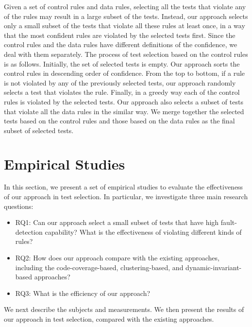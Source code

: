 \documentclass{sig-alternate}
\begin{document}
Given a set of control rules and data rules, selecting all the tests
that violate any of the rules may result in a large subset of the
tests. Instead, our approach selects only a small subset of the
tests that violate all these rules at least once, in a way that the
most confident rules are violated by the selected tests first. Since
the control rules and the data rules have different definitions of
the confidence, we deal with them separately. The process of test
selection based on the control rules is as follows. Initially, the
set of selected tests is empty. Our approach sorts the control rules
in descending order of confidence. From the top to bottom, if a rule
is not violated by any of the previously selected tests, our
approach randomly selects a test that violates the rule. Finally, in
a greedy way each of the control rules is violated by the selected
tests. Our approach also selects a subset of tests that violate all
the data rules in the similar way. We merge together the selected
tests based on the control rules and those based on the data rules
as the final subset of selected tests.







\section{Empirical Studies} \label{sec:studies}

In this section, we present a set of empirical studies to evaluate
the effectiveness of our approach in test selection. In particular,
we investigate three main research questions: %
\begin{itemize}
\item
RQ1: Can our approach select a small subset of tests that have high
fault-detection capability? What is the effectiveness of violating
different kinds of rules?
\item
RQ2: How does our approach compare with the existing approaches,
including the code-coverage-based, clustering-based, and
dynamic-invariant-based approaches?


\item
RQ3: What is the efficiency of our approach?


\end{itemize}


We next describe the subjects and measurements. We then present the
results of our approach in test selection, compared with the
existing approaches.
\end{document}
